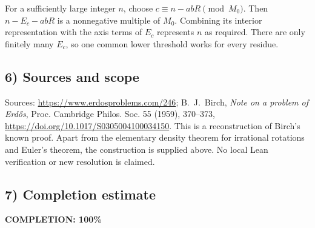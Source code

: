For a sufficiently large integer $n$, choose
$c\equiv n-abR\pmod{M_0}$. Then
$n-E_c-abR$ is a nonnegative multiple of $M_0$.
Combining its interior representation with the axis terms of
$E_c$ represents $n$ as required. There are only finitely many
$E_c$, so one common lower threshold works for every residue.

\subsection{6) Sources and scope}
Sources: \url{https://www.erdosproblems.com/246};
B.~J.~Birch, \emph{Note on a problem of Erd\H{o}s},
Proc. Cambridge Philos. Soc. 55 (1959), 370--373,
\url{https://doi.org/10.1017/S0305004100034150}.
This is a reconstruction of Birch's known proof. Apart from
the elementary density theorem for irrational rotations and
Euler's theorem, the construction is supplied above. No local
Lean verification or new resolution is claimed.
\subsection{7) Completion estimate}
\textbf{COMPLETION: 100\%}
